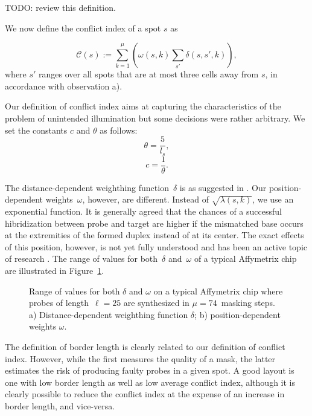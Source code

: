 \documentclass{bioinfo}
\begin{document}
TODO: review this definition.

We now define the conflict index of a spot $s$ as

\begin{equation}
\label{eq:conf_idx}
\mathcal{C}(s) := \sum_{k=1}^{\mu} \left( \omega(s,k) \sum_{s'} \delta(s,s',k) \right),
\end{equation}
where $s'$ ranges over all spots that are at most three cells away from $s$, in accordance with observation a).

Our definition of conflict index aims at capturing the characteristics of the problem of unintended illumination but some decisions were rather arbitrary. We set the constants $c$ and $\theta$ as follows:
\begin{displaymath}
\theta = \frac{5}{l_s},
\end{displaymath}
\begin{displaymath}
c = \frac{1}{\theta}.
\end{displaymath}

The distance-dependent weighthing function~$\delta$ is as suggested in \citealp{KAHNG03_1}. Our position-dependent weights~$\omega$, however, are different. Instead of $\sqrt{\lambda(s,k)}$, we use an exponential function. It is generally agreed that the chances of a successful hibridization between probe and target are higher if the mismatched base occurs at the extremities of the formed duplex instead of at its center. The exact effects of this position, however, is not yet fully understood and has been an active topic of research \citep{BINDER05}. The range of values for both~$\delta$ and~$\omega$ of a typical Affymetrix chip are illustrated in Figure~\ref{fig:conflit_index_values}.

\begin{figure}
\caption{Range of values for both $\delta$ and $\omega$ on a typical Affymetrix chip where probes of length~$\ell = 25$ are synthesized in $\mu = 74$~masking steps. a) Distance-dependent weighthing function $\delta$; b) position-dependent weights $\omega$.}
\label{fig:conflit_index_values}
\end{figure}

The definition of border length is clearly related to our definition of conflict index. However, while the first measures the quality of a mask, the latter estimates the risk of producing faulty probes in a given spot. A good layout is one with low border length as well as low average conflict index, although it is clearly possible to reduce the conflict index at the expense of an increase in border length, and vice-versa.
\end{document}
